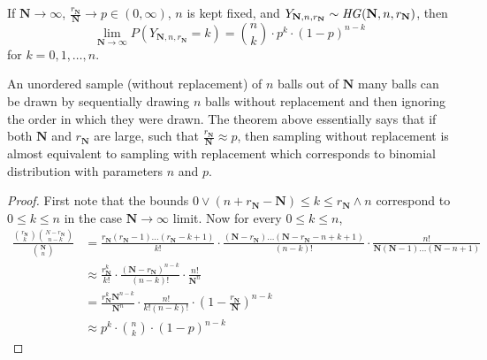 \begin{theorem}
    If $\mathbf{N} \rightarrow \infty$, $\frac{r_\mathbf{N}}{\mathbf{N}}
\rightarrow p \in (0, \infty)$, $n$ is kept fixed, and $Y_{\mathbf{N}, n,
r_\mathbf{N}} \sim \text{\emph{HG}}(\mathbf{N}, n, r_\mathbf{N})$, then 
\[
    \lim_{\mathbf{N} \rightarrow \infty} P(Y_{\mathbf{N}, n, r_\mathbf{N}} = k)
  = {n \choose k} \cdot p^k \cdot (1 - p)^{n - k}
\]
for $k = 0, 1, \dots, n$.
\end{theorem}
\note An unordered sample (without replacement) of $n$ balls out of
$\mathbf{N}$ many balls can be drawn by sequentially drawing $n$ balls without
replacement and then ignoring the order in which they were drawn. The theorem
above essentially says that if both $\mathbf{N}$ and $r_\mathbf{N}$ are large,
such that $\frac{r_\mathbf{N}}{\mathbf{N}} \approx p$, then sampling without
replacement is almost equivalent to sampling with replacement which corresponds
to binomial distribution with parameters $n$ and $p$.
\begin{proof}
    First note that the bounds $0 \lor (n + r_\mathbf{N} - \mathbf{N}) \leq k
\leq r_\mathbf{N} \land n$ correspond to $0 \leq k \leq n$ in the case
$\mathbf{N} \rightarrow \infty$ limit. Now for every $0 \leq k \leq n$,
\begin{align*}
    \frac{{r_\mathbf{N} \choose k}{{N - r_\mathbf{N}} \choose {n -k}}}
         {{\mathbf{N} \choose n}}
 &= \frac{r_\mathbf{N} (r_\mathbf{N} - 1) \dots (r_\mathbf{N} - k + 1)}{k!}
    \cdot
    \frac{(\mathbf{N} - r_\mathbf{N}) \dots (\mathbf{N} - r_\mathbf{N} - n
         + k + 1)}{(n-k)!}
    \cdot
    \frac{n!}{\mathbf{N}(\mathbf{N} - 1) \dots (\mathbf{N} - n + 1)}         \\
 &\approx \frac{r_\mathbf{N}^k}{k!} \cdot
          \frac{(\mathbf{N} - r_\mathbf{N})^{n - k}}{(n - k)!} \cdot
          \frac{n!}{\mathbf{N}^n}                                            \\
 &= \frac{r_\mathbf{N}^k \mathbf{N}^{n - k}}{\mathbf{N}^n} \cdot
    \frac{n!}{k! (n - k)!} \cdot
    (1 - \frac{r_\mathbf{N}}{\mathbf{N}})^{n - k}                            \\
 &\approx p^k \cdot {n \choose k} \cdot (1 - p)^{n - k}
\end{align*}
\end{proof}

